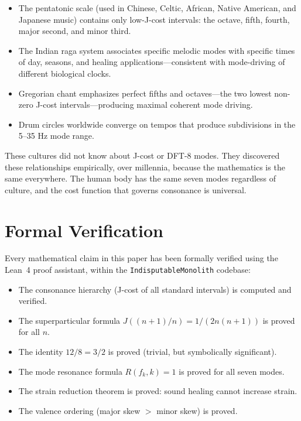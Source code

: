 \documentclass[11pt,a4paper]{article}
\begin{document}
\begin{itemize}
    \item The pentatonic scale (used in Chinese, Celtic, African, Native American, and Japanese music) contains only low-J-cost intervals: the octave, fifth, fourth, major second, and minor third.
    \item The Indian raga system associates specific melodic modes with specific times of day, seasons, and healing applications---consistent with mode-driving of different biological clocks.
    \item Gregorian chant emphasizes perfect fifths and octaves---the two lowest non-zero J-cost intervals---producing maximal coherent mode driving.
    \item Drum circles worldwide converge on tempos that produce subdivisions in the 5--35 Hz mode range.
\end{itemize}

These cultures did not know about J-cost or DFT-8 modes. They discovered these relationships empirically, over millennia, because the mathematics is the same everywhere. The human body has the same seven modes regardless of culture, and the cost function that governs consonance is universal.

\section{Formal Verification}

Every mathematical claim in this paper has been formally verified using the Lean~4 proof assistant, within the \texttt{IndisputableMonolith} codebase:

\begin{itemize}
    \item The consonance hierarchy (J-cost of all standard intervals) is computed and verified.
    \item The superparticular formula $J((n+1)/n) = 1/(2n(n+1))$ is proved for all $n$.
    \item The identity $12/8 = 3/2$ is proved (trivial, but symbolically significant).
    \item The mode resonance formula $R(f_k, k) = 1$ is proved for all seven modes.
    \item The strain reduction theorem is proved: sound healing cannot increase strain.
    \item The valence ordering (major skew $>$ minor skew) is proved.
\end{itemize}
\end{document}
